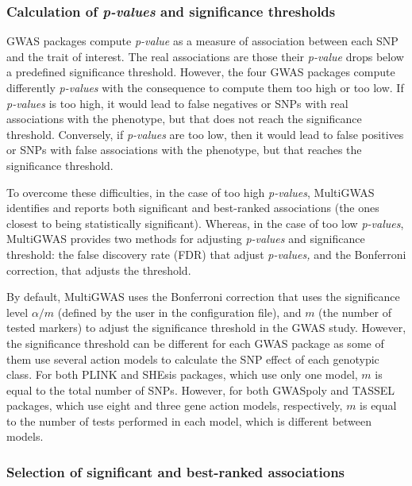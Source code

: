 \documentclass{article}
\begin{document}
\subsubsection{Calculation of \emph{p-values }and significance thresholds}

GWAS packages compute \emph{p-value }as a measure of association between each SNP and the trait of interest. The real associations are those their \emph{p-value }drops below a predefined significance threshold. However, the four GWAS packages compute differently \emph{p-values} with the consequence to compute them too high or too low. If \emph{p-values} is too high, it would lead to false negatives or SNPs with real associations with the phenotype, but that does not reach the significance threshold. Conversely, if \emph{p-values} are too low, then it would lead to false positives or SNPs with false associations with the phenotype, but that reaches the significance threshold.

To overcome these difficulties, in the case of too high \emph{p-values}, MultiGWAS identifies and reports both significant and best-ranked associations (the ones closest to being statistically significant). Whereas, in the case of too low \emph{p-values}, MultiGWAS provides two methods for adjusting \emph{p-values} and significance threshold: the false discovery rate (FDR) that adjust \emph{p-values, }and the Bonferroni correction, that adjusts the threshold.

By default, MultiGWAS uses the Bonferroni correction that uses the significance level  $\alpha/m$ (defined by the user in the configuration file), and $m$ (the number of tested markers) to adjust the significance threshold in the GWAS study. However, the significance threshold can be different for each GWAS package as some of them use several action models to calculate the SNP effect of each genotypic class. For both PLINK and SHEsis packages, which use only one model, $m$ is equal to the total number of SNPs. However, for both GWASpoly and TASSEL packages, which use eight and three gene action models, respectively, $m$ is equal to the number of tests performed in each model, which is different between models. 


\subsubsection{Selection of significant and best-ranked associations}
\end{document}
